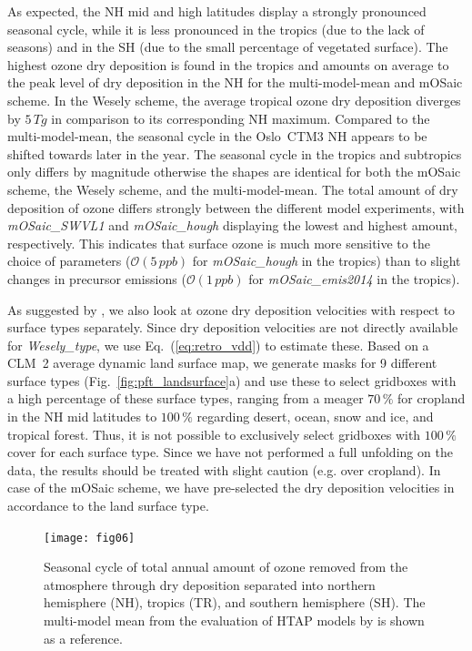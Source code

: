 \documentclass[gmd, manuscript]{copernicus}
\begin{document}
As expected, the NH mid and high latitudes display a strongly pronounced seasonal cycle, while it is less pronounced in the tropics (due to the lack of seasons) and in the SH (due to the small percentage of vegetated surface). The highest ozone dry deposition is found in the tropics and amounts on average to the  peak level of dry deposition in the NH for the multi-model-mean \citep{ACP:Hardacre2015} and mOSaic scheme. In the Wesely scheme, the average tropical ozone dry deposition diverges by $5\,\unit{Tg}$ in comparison to its corresponding NH maximum. Compared to the multi-model-mean, the seasonal cycle in the Oslo~CTM3 NH appears to be shifted towards later in the year. The seasonal cycle in the tropics and subtropics only differs by magnitude otherwise the shapes are identical for both the mOSaic scheme, the Wesely scheme, and the multi-model-mean. The total amount of dry deposition of ozone differs strongly between the different model experiments, with \emph{mOSaic\_SWVL1} and \emph{mOSaic\_hough} displaying the lowest and highest amount, respectively. This indicates that surface ozone is much more sensitive to the choice of parameters ($\mathcal{O}(5\,\unit{ppb})$ for \emph{mOSaic\_hough} in the tropics) than to slight changes in precursor emissions ($\mathcal{O}(1\,\unit{ppb})$ for \emph{mOSaic\_emis2014} in the tropics).

As suggested by \citet{ACP:Hardacre2015}, we also look at ozone dry deposition velocities with respect to surface types separately. Since dry deposition velocities are not directly available for \emph{Wesely\_type}, we use Eq.~(\ref{eq:retro_vdd}) to estimate these. Based on a CLM~2 average dynamic land surface map, we generate masks for 9 different surface types (Fig.~\ref{fig:pft_landsurface}a) and use these to select gridboxes with a high percentage of these surface types, ranging from a meager $70\,\unit{\%}$ for cropland in the NH mid latitudes to $100\,\unit{\%}$ regarding desert, ocean, snow and ice, and tropical forest. Thus, it is not possible to exclusively select gridboxes with $100\,\unit{\%}$ cover for each surface type. Since we have not performed a full unfolding on the data, the results should be treated with slight caution (e.g. over cropland). In case of the mOSaic scheme, we have pre-selected the dry deposition velocities in accordance to the land surface type.
%
\begin{figure}[t]
  \texttt{[image: fig06]}
  \caption{Seasonal cycle of total annual amount of ozone removed from the atmosphere through dry deposition separated into northern hemisphere (NH), tropics (TR), and southern hemisphere (SH). The multi-model mean from the evaluation of HTAP models by \citet{ACP:Hardacre2015} is shown as a reference.}
  \label{fig:mmm_drydep_hem}
\end{figure}
%
\end{document}
